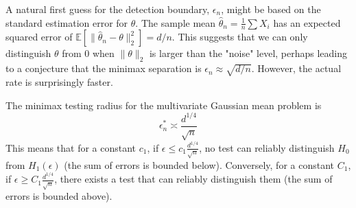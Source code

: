 A natural first guess for the detection boundary, $\epsilon_n$, might be based on the standard estimation error for $\theta$. The sample mean $\hat{\theta}_n = \frac{1}{n}\sum X_i$ has an expected squared error of $\mathbb{E}[\|\hat{\theta}_n - \theta\|_2^2] = d/n$. This suggests that we can only distinguish $\theta$ from $0$ when $\|\theta\|_2$ is larger than the "noise" level, perhaps leading to a conjecture that the minimax separation is $\epsilon_n \approx \sqrt{d/n}$. However, the actual rate is surprisingly faster.

\begin{thm}
The minimax testing radius for the multivariate Gaussian mean problem is
$$
\epsilon_n^* \asymp \frac{d^{1/4}}{\sqrt{n}}
$$
This means that for a constant $c_1$, if $\epsilon \le c_1 \frac{d^{1/4}}{\sqrt{n}}$, no test can reliably distinguish $H_0$ from $H_1(\epsilon)$ (the sum of errors is bounded below). Conversely, for a constant $C_1$, if $\epsilon \ge C_1 \frac{d^{1/4}}{\sqrt{n}}$, there exists a test that can reliably distinguish them (the sum of errors is bounded above).
\end{thm}
